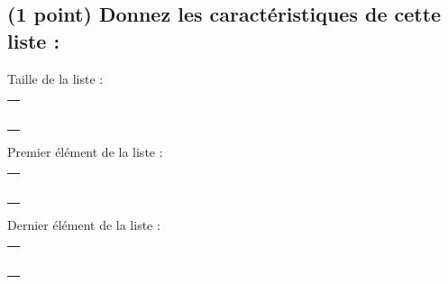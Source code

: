 \documentclass[11pt,a4paper]{article}
\begin{document}
\bigskip

\subsection{(1 point) Donnez les caractéristiques de cette liste : }

\bigskip

\begin{table}[h!]
  \centering
  \begin{minipage}{0.3\textwidth}
    \centering
Taille de la liste :

\medskip

\begin{tabular}{ | m{2.5cm} | }
\hline
 \\ \\ \\ \\ \\ \\
\hline
\end{tabular}

  \end{minipage}
  \hfillx
  \begin{minipage}{0.3\textwidth}
    \centering
Premier élément de la liste :

\medskip

\begin{tabular}{ | m{2.5cm} | }
\hline
 \\ \\ \\ \\ \\ \\
\hline
\end{tabular}

  \end{minipage}
  \hfillx
  \begin{minipage}{0.3\textwidth}
    \centering
Dernier élément de la liste :

\medskip

\begin{tabular}{ | m{2.5cm} | }
\hline
 \\ \\ \\ \\ \\ \\
\hline
\end{tabular}

  \end{minipage}
\end{table}
\end{document}
